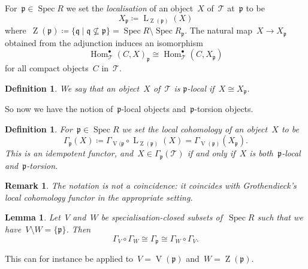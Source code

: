 \documentclass[10pt,a4paper]{article}
\theoremstyle{lecture}
\newtheorem{definition}[theorem]{Definition}
\newtheorem{lemma}[theorem]{Lemma}
\newtheorem{remark}[theorem]{Remark}
\newcommand\dash{\nobreakdash-\hspace{0pt}}
\DeclareMathOperator\Hom{Hom}
\DeclareMathOperator\LL{L}
\DeclareMathOperator\Spec{Spec}
\DeclareMathOperator\VV{V}
\DeclareMathOperator\ZZ{Z}
\begin{document}
For~$\mathfrak{p}\in\Spec R$ we set the \emph{localisation} of an object~$X$ of~$\mathcal{T}$ at~$\mathfrak{p}$ to be
\begin{equation}
  X_{\mathfrak{p}}\coloneqq\LL_{\ZZ(\mathfrak{p})}(X)
\end{equation}
where~$\ZZ(\mathfrak{p})\coloneqq\{\mathfrak{q}\mid\mathfrak{q}\nsubseteq\mathfrak{p}\}=\Spec R\setminus\Spec R_{\mathfrak{p}}$. The natural map~$X\to X_{\mathfrak{p}}$ obtained from the adjunction induces an isomorphism
\begin{equation}
  \Hom_{\mathcal{T}}^\bullet(C,X)_{\mathfrak{p}}\cong\Hom_{\mathcal{T}}^\bullet(C,X_{\mathfrak{p}})
\end{equation}
for all compact objects~$C$ in~$\mathcal{T}$.

\begin{definition}
  We say that an object~$X$ of~$\mathcal{T}$ is \emph{$\mathfrak{p}$\dash local} if~$X\cong X_{\mathfrak{p}}$.
\end{definition}

So now we have the notion of~$\mathfrak{p}$\dash local objects and~$\mathfrak{p}$\dash torsion objects.

\begin{definition}
  For~$\mathfrak{p}\in\Spec R$ we set the \emph{local cohomology} of an object~$X$ to be
  \begin{equation}
    \Gamma_{\mathfrak{p}}(X)\coloneqq\Gamma_{\VV(\mathfrak{p}}\circ\LL_{\ZZ(\mathfrak{p})}(X)=\Gamma_{\VV(\mathfrak{p})}(X_{\mathfrak{p}}).
  \end{equation}
  This is an idempotent functor, and~$X\in\Gamma_{\mathfrak{p}}(\mathcal{T})$ if and only if~$X$ is both~$\mathfrak{p}$\dash local and~$\mathfrak{p}$\dash torsion.
\end{definition}

\begin{remark}
  The notation is not a coincidence: it coincides with Grothendieck's local cohomology functor in the appropriate setting.
\end{remark}

\begin{lemma}
  Let~$V$ and~$W$ be specialisation-closed subsets of~$\Spec R$ such that we have~$V\setminus W=\{\mathfrak{p}\}$. Then
  \begin{equation}
    \Gamma_V\circ\Gamma_W\cong\Gamma_{\mathfrak{p}}\cong\Gamma_W\circ\Gamma_V.
  \end{equation}
\end{lemma}
This can for instance be applied to~$V=\VV(\mathfrak{p})$ and~$W=\ZZ(\mathfrak{p})$.
\end{document}

